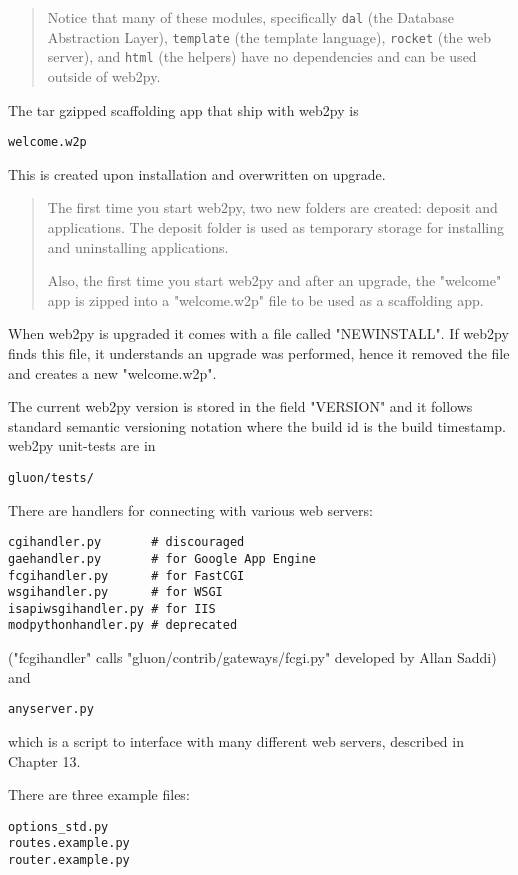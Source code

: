 \documentclass[justified,sixbynine,notoc]{tufte-book}
\def\ft{\small\tt}
\begin{document}
\begin{fullwidth}
\begin{quote}Notice that many of these modules, specifically {\ft dal} (the Database Abstraction Layer), {\ft template} (the template language), {\ft rocket} (the web server), and
{\ft html} (the helpers) have no dependencies and can be used outside of web2py.\end{quote}
The tar gzipped scaffolding app that ship with web2py is
\begin{lstlisting}
welcome.w2p
\end{lstlisting}

This is created upon installation and overwritten on upgrade.

\begin{quote}The first time you start web2py, two new folders are created: deposit and applications. The deposit folder is used as temporary storage for installing and uninstalling applications.

Also, the first time you start web2py and after an upgrade, the "welcome" app is zipped into a "welcome.w2p" file to be used as a scaffolding app.\end{quote}
When web2py is upgraded it comes with a file called "NEWINSTALL". If web2py finds this file, it understands an upgrade was performed, hence it removed the file and creates a new "welcome.w2p".

The current web2py version is stored in the field "VERSION" and it follows standard semantic versioning notation where the build id is the build timestamp.
\noindent web2py unit-tests are in
\begin{lstlisting}
gluon/tests/
\end{lstlisting}

There are handlers for connecting with various web servers:
\begin{lstlisting}
cgihandler.py       # discouraged
gaehandler.py       # for Google App Engine
fcgihandler.py      # for FastCGI
wsgihandler.py      # for WSGI
isapiwsgihandler.py # for IIS
modpythonhandler.py # deprecated
\end{lstlisting}

("fcgihandler" calls  "gluon/contrib/gateways/fcgi.py" developed by Allan Saddi) and

\begin{lstlisting}
anyserver.py
\end{lstlisting}
\noindent which is a script to interface with many different web servers, described in Chapter 13.

There are three example files:
\begin{lstlisting}
options_std.py
routes.example.py
router.example.py
\end{lstlisting}


\end{fullwidth}
\end{document}
